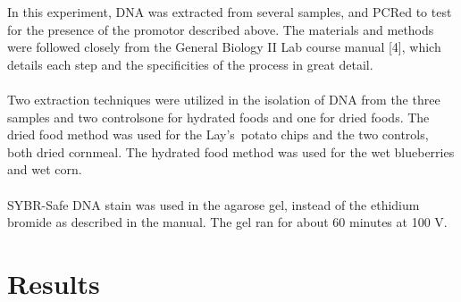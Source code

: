\documentclass{article}
\begin{document}
In this experiment, DNA was extracted from several samples, and PCRed to test for the presence of the promotor described above. The materials and methods were followed closely from the General Biology II Lab course manual [4], which details each step and the specificities of the process in great detail. \\
\\
Two extraction techniques were utilized in the isolation of DNA from the three samples and two controls\textemdash one for hydrated foods and one for dried foods. The dried food method was used for the Lay's\texttrademark \  potato chips and the two controls, both dried cornmeal. The hydrated food method was used for the wet blueberries and wet corn. \\
\\
SYBR-Safe DNA stain was used in the agarose gel, instead of the ethidium bromide as described in the manual. The gel ran for about 60 minutes at 100 V.


\section{Results}
\end{document}
